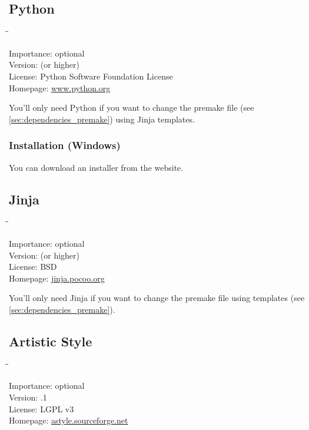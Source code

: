 \subsection{Python}

\begin{tabbing}
  \hspace*{6em}\=\=\kill

  Importance:  \> optional \\
  Version:      (or higher) \\
  License:     \> Python Software Foundation License \\
  Homepage:    \> \href{http://www.python.org/}{www.python.org}
\end{tabbing}

You'll only need Python if you want to change the premake file (see
\ref{sec:dependencies_premake}) using Jinja templates.

\subsubsection{Installation (Windows)}

You can download an installer from the website.

\subsection{Jinja}

\begin{tabbing}
  \hspace*{6em}\=\=\kill

  Importance:  \> optional \\
  Version:      (or higher) \\
  License:     \> BSD \\
  Homepage:    \> \href{http://jinja.pocoo.org/}{jinja.pocoo.org}
\end{tabbing}

You'll only need Jinja if you want to change the premake file using
templates (see \ref{sec:dependencies_premake}).

\subsection{Artistic Style}

\begin{tabbing}
  \hspace*{6em}\=\=\kill

  Importance:  \> optional \\
  Version:     .1 \\
  License:     \> LGPL v3 \\
  Homepage:    \> \href{http://astyle.sourceforge.net/}{astyle.sourceforge.net}
\end{tabbing}

